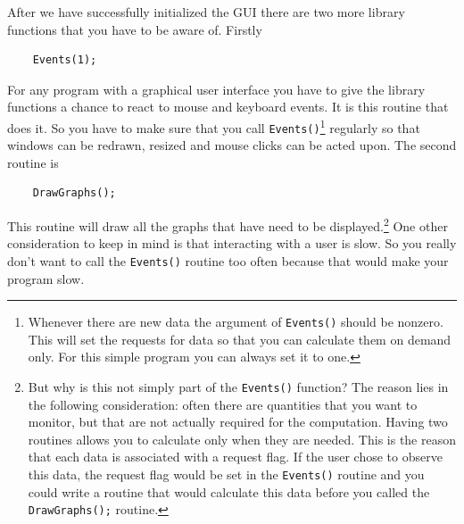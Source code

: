 \documentclass[12pt,letterpaper]{article}
\begin{document}
After we have successfully initialized the GUI there are two more
library functions that you have to be aware of. Firstly
\begin{verbatim}
    Events(1); 
\end{verbatim}
For any program with a graphical user interface you have to give the
library functions a chance to react to mouse and keyboard events. It
is this routine that does it. So you have to make sure that you call 
\texttt{Events()}\footnote{Whenever there are new data the argument of 
          \texttt{Events()} should be nonzero. This will set the
          requests for data so that you can calculate them
          on demand only. For this simple program you can
          always set it to one.}
regularly so that windows can be redrawn, resized and mouse clicks can
be acted upon. The second routine is 
\begin{verbatim}
    DrawGraphs();
\end{verbatim}
This routine will draw all the graphs that have need to be
displayed.\footnote{But why is this not simply part of the \texttt{Events()}
function? The reason lies in the following consideration: often there
are quantities that you want to monitor, but that are not actually
required for the computation. Having two routines allows you to
calculate only when they are needed. This is the reason that each data
is associated with a request flag. If the user chose to observe this
data, the request flag would be set in the \texttt{Events()}
routine and you could write a routine that would calculate this data
before you called the \texttt{DrawGraphs();} routine.}
One other consideration to keep in mind is that interacting with a
user is slow. So you really don't want to call the \texttt{Events()}
routine too often because that would make your program slow.
\end{document}

